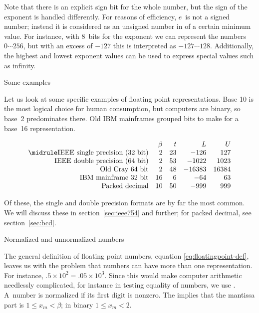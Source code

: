 Note that there is an explicit sign bit for the whole number, but the sign
of the exponent is handled differently. 
For reasons of efficiency, $e$~is not a signed number; instead it is
considered as an unsigned number in  of a certain minimum
value. For instance, with 8~bits for the exponent we can represent
the numbers~$0\cdots 256$, but with an excess of $-127$ this is interpreted
as $-127\cdots 128$.
Additionally, the highest and lowest exponent values 
can be used to express special values such as infinity.


 {Some examples}

Let us look at some specific examples of floating point
representations. Base 10 is the most logical choice for human
consumption, but computers are binary, so base~2 predominates
there. Old IBM mainframes grouped bits to make for a base~16
representation.

\begin{equation}
\begin{array}{rrrrr}
  &\beta&t&L&U\\ \midrule
  \hbox{IEEE single precision (32 bit)}&2&23&-126&127\\
  \hbox{IEEE double precision (64 bit)}&2&53&-1022&1023\\
  \hbox{Old Cray 64 bit}&2&48&-16383&16384\\
  \hbox{IBM mainframe 32 bit}&16&6&-64&63\\
  \hbox{Packed decimal}&10&50&-999&999\\
\end{array}
\end{equation}

Of these, the single and double precision formats are by far the most
common. We will discuss these in section~\ref{sec:ieee754} and
further; for packed decimal, see section~\ref{sec:bcd}.


 {Normalized and unnormalized numbers}
\label{sec:normal-unnormal}

The general definition of floating point numbers,
equation \eqref{eq:floatingpoint-def}, leaves us with the problem that numbers
can have more than one representation. For instance,
$.5\times10^{2}=.05\times 10^3$. Since this would make computer
arithmetic needlessly complicated, for instance in testing equality of
numbers, we use . A~number is normalized if its first digit is nonzero.
The implies that the mantissa part is $1\leq x_m <\beta$;
in binary $1\leq x_m<2$.


